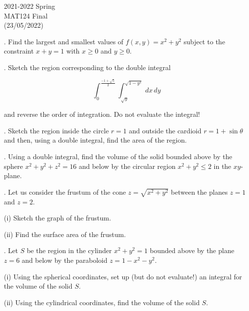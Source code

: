\documentclass{article}
\begin{document}
\pagestyle{empty}
\large

\begin{center}
2021-2022 Spring \\MAT124 Final\\(23/05/2022)
\end{center}

. Find the largest and smallest values of $f(x,y) = x^2+y^2$ subject to the constraint $x+y=1$ with $x\geq0$ and $y\geq0$.

\hfill

. Sketch the region corresponding to the double integral

\begin{equation*}
    \int_0^{\frac{-1+\sqrt5}{2}}\int_{\sqrt{y}}^{\sqrt{1-y^2}}\,dx\,dy
\end{equation*}

\hfill

\noindent and reverse the order of integration. Do not evaluate the integral!

\hfill

. Sketch the region inside the circle $r=1$ and outside the cardioid $r=1+\sin\theta$ and then, using a double integral, find the area of the region.

\hfill

. Using a double integral, find the volume of the solid bounded above by the sphere $x^2+y^2+z^2 = 16$ and below by the circular region $x^2+y^2\leq2$ in the $xy$-plane.

\hfill

. Let us consider the frustum of the cone $z=\sqrt{x^2+y^2}$ between the planes $z=1$ and $z=2$.

\hfill

\noindent (i) Sketch the graph of the frustum.

\hfill

\noindent (ii) Find the surface area of the frustum.

\hfill

. Let $S$ be the region in the cylinder $x^2+y^2 = 1$ bounded above by the plane $z=6$ and below by the paraboloid $z=1-x^2-y^2$.

\hfill

\noindent (i) Using the spherical coordinates, set up (but do not evaluate!) an integral for the volume of the solid $S$.

\hfill

\noindent (ii) Using the cylindrical coordinates, find the volume of the solid $S$.
\end{document}
